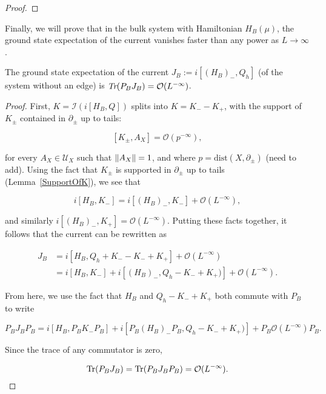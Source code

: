 \documentclass[12pt, letterpaper]{article}
\begin{document}
\begin{proof}





\end{proof}

Finally, we will prove that in the bulk system with Hamiltonian $H_B(\mu)$, the ground state expectation of the current vanishes faster than any power as $L \to \infty$.

\begin{lemma}
The ground state expectation of the current $J_B := i[(H_B)_-, Q_h]$ (of the system without an edge) is $\emph{Tr}(P_BJ_B)=\mathcal{O}(L^{-\infty})$.
\label{J=0Bulk}
\end{lemma}
\begin{proof}
First, $K = \mathcal{I}(i[H_B, Q])$ splits into $K = K_- - K_+$, with the support of $K_\pm$ contained in $\partial_\pm$ up to tails:

\[[K_\pm, A_X] = \mathcal{O}(p^{-\infty}),\]

for every $A_X \in \mathcal{U}_X$ such that $\lVert A_X \rVert=1$, and where $p = \text{dist}(X, \partial_\pm)$ (need to add). Using the fact that $K_\pm$ is supported in $\partial_\pm$ up to tails (Lemma~\ref{SupportOfK}), we see that 

\[i[H_B, K_-] = i[(H_B)_-, K_-] + \mathcal{O}(L^{-\infty}),\]

and similarly $i[(H_B)_-, K_+] = \mathcal{O}(L^{-\infty})$. Putting these facts together, it follows that the current can be rewritten as 

\[\begin{aligned} 
J _B&= i[H_B, Q_h + K_- - K_- + K_+] + \mathcal{O}(L^{-\infty})\\
&= i[H_B, K_-] + i[(H_B)_-, Q_h - K_- + K_+)] + \mathcal{O}(L^{-\infty}).
\end{aligned}\]

From here, we use the fact that $H_B$ and $Q_h-K_-+K_+$ both commute with $P_B$ to write

\[P_BJ_BP_B = i[H_B, P_BK_-P_B] + i[P_B(H_B)_-P_B, Q_h - K_- + K_+)] + P_B\mathcal{O}(L^{-\infty})P_B.\]

Since the trace of any commutator is zero, 

\[\text{Tr}(P_BJ_B) = \text{Tr}(P_BJ_BP_B) = \mathcal{O}(L^{-\infty}).\]

\end{proof}
\end{document}
